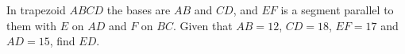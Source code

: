 In trapezoid $ABCD$ the bases are $AB$ and $CD$, and $EF$ is a segment parallel to them with $E$ on $AD$ and $F$ on $BC$. Given that $AB=12$, $CD=18$, $EF=17$ and $AD=15$, find $ED$.
